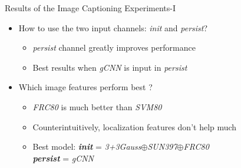 \documentclass{beamer}
\begin{document}
\begin{frame}{Results of the Image Captioning Experiments-I}
\begin{itemize}
    \item<1-> How to use the two input channels: \emph{init} and \emph{persist}?
       \begin{itemize}
           \item<1-> \emph{persist} channel greatly improves performance
           \item<1-> Best results when \emph{gCNN} is input in \emph{persist} 
       \end{itemize}
    \item<1-> Which image features perform best ?
       \begin{itemize}
           \item<1-> \emph{FRC80} is much better than \emph{SVM80}
           \item<1-> Counterintuitively, localization features don't help much 
           \item<1-> Best model: \textbf{\emph{init}} = \emph{3+3Gauss$\oplus$SUN397$\oplus$FRC80}\\ \textbf{\emph{persist}} = \emph{gCNN}
       \end{itemize}
\end{itemize}
\end{frame}
\end{document}
